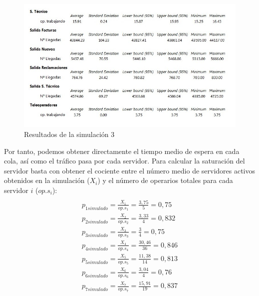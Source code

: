 \begin{figure}[H]
\begin{center}
\centering
  \includegraphics[width=1\textwidth]{./images/foto3}
  \caption{Resultados de la simulación 3}
  \label{fig: Resultados de la simulacion 3}
\end{center}
\end{figure}
Por tanto, podemos obtener directamente el tiempo medio de espera en cada cola, así como el tráfico pasa por cada servidor. Para calcular la saturación del servidor basta con obtener el cociente entre el número medio de servidores activos obtenidos en la simulación ($X_{i}$) y el número de operarios totales para cada servidor $i$ ($op.s_{i}$):
\begin{multline}\\
p_{1 simulado} = \frac{X_{1}}{op.s_{1}} = \frac{3,75}{5} = 0,75 \\
p_{2 simulado} = \frac{X_{2}}{op.s_{2}} = \frac{3,33}{4} = 0,832\\
p_{3 simulado} = \frac{X_{3}}{op.s_{3}} = \frac{3}{4} = 0,75\\
p_{4 simulado} = \frac{X_{4}}{op.s_{4}} = \frac{30,46}{36} = 0,846\\
p_{5 simulado} = \frac{X_{5}}{op.s_{5}} = \frac{11,38}{14} = 0,813\\
p_{6 simulado} = \frac{X_{6}}{op.s_{6}} = \frac{3,04}{4} = 0,76\\
p_{7 simulado} = \frac{X_{7}}{op.s_{7}} = \frac{15,91}{19} = 0,837\\
\end{multline}
